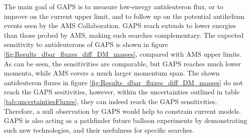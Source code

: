 The main goal of GAPS is to measure low-energy antideuteron flux, or to improve on the current upper limit, and to follow up on the potential antihelium events seen by the AMS Collaboration. GAPS reach extends to lower energies than those probed by AMS, making such searches complementary. The expected sensitivity to antideuterons of GAPS is shown in figure \ref{fig:Results_dbar_fluxes_diff_DM_masses}, compared with AMS upper limits. As can be seen, the sensitivities are comparable, but GAPS reaches much lower momenta, while AMS covers a much larger momentum span. The shown antideuteron fluxes in figure \ref{fig:Results_dbar_fluxes_diff_DM_masses} do not reach the GAPS sesitivities, however, within the uncertainties outlined in table \ref{tab:uncertaintiesFluxes}, they can indeed reach the GAPS sensitivities. Therefore, a null observation by GAPS would help to constrain current models. GAPS is also acting as a pathfinder future balloon experiments by demonstrating such new technologies, and their usefulness for specific searches. 



